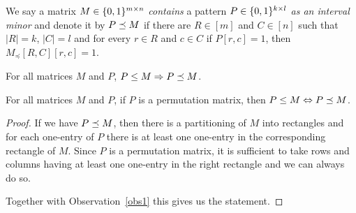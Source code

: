 \begin{defn}
We say a matrix $M\in\{0,1\}^{m\times n}$ \emph{contains} a pattern $P\in\{0,1\}^{k\times l}$ \emph{as an interval minor} and denote it by $P\preceq M$ if there are $R\in[m]$ and $C\in[n]$ such that $|R|=k$, $|C|=l$ and for every $r\in R$ and $c\in C$ if $P[r,c]=1$, then $M_{\preceq}[R,C][r,c]=1$.
\end{defn}
%
%
%
\begin{obs}
\label{obs1}
For all matrices $M$ and $P$, $P\leq M\Rightarrow P\preceq M$.
\end{obs}
\begin{obs}
For all matrices $M$ and $P$, if $P$ is a permutation matrix, then $P\leq M\Leftrightarrow P\preceq M$.
\end{obs}
\begin{proof}
If we have $P\preceq M$, then there is a partitioning of $M$ into rectangles and for each one-entry of $P$ there is at least one one-entry in the corresponding rectangle of $M$. Since $P$ is a permutation matrix, it is sufficient to take rows and columns having at least one one-entry in the right rectangle and we can always do so.

Together with Observation~\ref{obs1} this gives us the statement.
\end{proof}